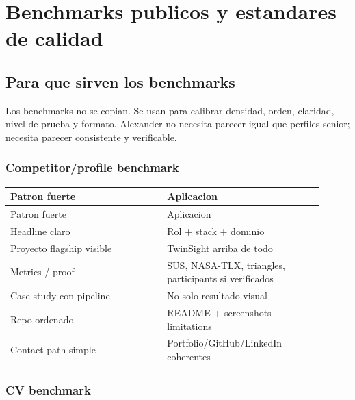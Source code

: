 \chapter{Benchmarks publicos y estandares de calidad}

\section{Para que sirven los benchmarks}


Los benchmarks no se copian. Se usan para calibrar densidad, orden, claridad, nivel de prueba y formato. Alexander no necesita parecer igual que perfiles senior; necesita parecer consistente y verificable.


\subsection{Competitor/profile benchmark}


\begin{center}
\scriptsize
\begin{longtable}{>{\raggedright\arraybackslash}p{0.455\linewidth} >{\raggedright\arraybackslash}p{0.455\linewidth}}
\toprule
Patron fuerte & Aplicacion \\
\midrule
\endfirsthead
\toprule
Patron fuerte & Aplicacion \\
\midrule
\endhead
Headline claro & Rol + stack + dominio \\
Proyecto flagship visible & TwinSight arriba de todo \\
Metrics / proof & SUS, NASA-TLX, triangles, participants si verificados \\
Case study con pipeline & No solo resultado visual \\
Repo ordenado & README + screenshots + limitations \\
Contact path simple & Portfolio/GitHub/LinkedIn coherentes \\
\bottomrule
\end{longtable}
\end{center}


\subsection{CV benchmark}


